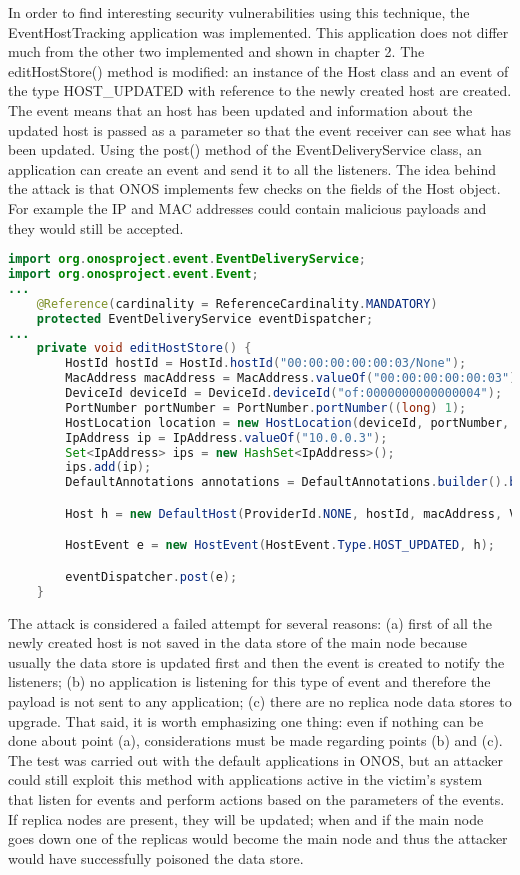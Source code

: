 In order to find interesting security vulnerabilities using this technique, the EventHostTracking application was implemented. This application does not differ much from the other two implemented and shown in chapter 2. The editHostStore() method is modified: an instance of the Host class and an event of the type HOST\_UPDATED with reference to the newly created host are created. The event means that an host has been updated and information about the updated host is passed as a parameter so that the event receiver can see what has been updated. Using the post() method of the EventDeliveryService class, an application can create an event and send it to all the listeners. The idea behind the attack is that ONOS implements few checks on the fields of the Host object. For example the IP and MAC addresses could contain malicious payloads and they would still be accepted.
\begin{lstlisting}[language=Java]
import org.onosproject.event.EventDeliveryService;
import org.onosproject.event.Event;
...
    @Reference(cardinality = ReferenceCardinality.MANDATORY)
    protected EventDeliveryService eventDispatcher;
...
    private void editHostStore() {
        HostId hostId = HostId.hostId("00:00:00:00:00:03/None");
        MacAddress macAddress = MacAddress.valueOf("00:00:00:00:00:03");
        DeviceId deviceId = DeviceId.deviceId("of:0000000000000004");
        PortNumber portNumber = PortNumber.portNumber((long) 1);
        HostLocation location = new HostLocation(deviceId, portNumber, (long) 1);
        IpAddress ip = IpAddress.valueOf("10.0.0.3");
        Set<IpAddress> ips = new HashSet<IpAddress>();
        ips.add(ip);
        DefaultAnnotations annotations = DefaultAnnotations.builder().build();

        Host h = new DefaultHost(ProviderId.NONE, hostId, macAddress, VlanId.NONE, location, ips, annotations);

        HostEvent e = new HostEvent(HostEvent.Type.HOST_UPDATED, h);

        eventDispatcher.post(e);
    }
\end{lstlisting}
The attack is considered a failed attempt for several reasons: (a) first of all the newly created host is not saved in the data store of the main node because usually the data store is updated first and then the event is created to notify the listeners; (b) no application is listening for this type of event and therefore the payload is not sent to any application; (c) there are no replica node data stores to upgrade. That said, it is worth emphasizing one thing: even if nothing can be done about point (a), considerations must be made regarding points (b) and (c). The test was carried out with the default applications in ONOS, but an attacker could still exploit this method with applications active in the victim's system that listen for events and perform actions based on the parameters of the events. If replica nodes are present, they will be updated; when and if the main node goes down one of the replicas would become the main node and thus the attacker would have successfully poisoned the data store.

